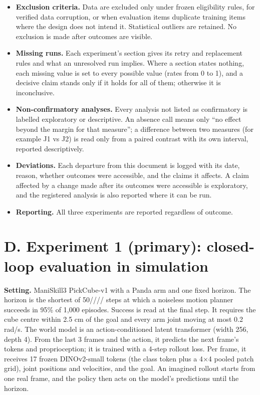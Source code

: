 \documentclass[10pt,letterpaper]{article}
\newcommand{\usd}{{\usefont{OT1}{cmr}{m}{n}\char36}}
\begin{document}
\begin{itemize}
  There are no interim looks and no extension for
  significance. The hard budget cap is \usd{}2,000.
\item
  \textbf{Exclusion criteria.} Data are excluded only under
  frozen eligibility rules, for verified data corruption, or
  when evaluation items duplicate training items where the
  design does not intend it. Statistical outliers are
  retained. No exclusion is made after outcomes are visible.
\item
  \textbf{Missing runs.} Each experiment's section gives its
  retry and replacement rules and what an unresolved run
  implies. Where a section states nothing, each missing
  value is set to every possible value (rates from 0 to 1),
  and a decisive claim stands only if it holds for all of
  them; otherwise it is inconclusive.
\item
  \textbf{Non-confirmatory analyses.} Every analysis not
  listed as confirmatory is labelled exploratory or
  descriptive. An absence call means only ``no effect beyond
  the margin for that measure''; a difference between two
  measures (for example J1 vs J2) is read only from a paired
  contrast with its own interval, reported descriptively.
\item
  \textbf{Deviations.} Each departure from this document is
  logged with its date, reason, whether outcomes were
  accessible, and the claims it affects. A claim affected by
  a change made after its outcomes were accessible is
  exploratory, and the registered analysis is also reported
  where it can be run.
\item
  \textbf{Reporting.} All three experiments are reported
  regardless of outcome.
\end{itemize}

\hypertarget{d.-experiment-1-primary-closed-loop-evaluation-in-simulation}{%
\section{D. Experiment 1 (primary): closed-loop evaluation
in
simulation}\label{d.-experiment-1-primary-closed-loop-evaluation-in-simulation}}

\textbf{Setting.} ManiSkill3 PickCube-v1 with a Panda arm
and one fixed horizon. The horizon is the shortest of
50//// steps at which a noiseless motion planner
succeeds in 95\% of 1,000 episodes. Success is read at the
final step. It requires the cube centre within 2.5 cm of the
goal and every arm joint moving at most 0.2 rad/s. The world
model is an action-conditioned latent transformer (width
256, depth 4). From the last 3 frames and the action, it
predicts the next frame's tokens and proprioception; it is
trained with a 4-step rollout loss. Per frame, it receives
17 frozen DINOv2-small tokens (the class token plus a 4×4
pooled patch grid), joint positions and velocities, and the
goal. An imagined rollout starts from one real frame, and
the policy then acts on the model's predictions until the
horizon.
\end{document}
